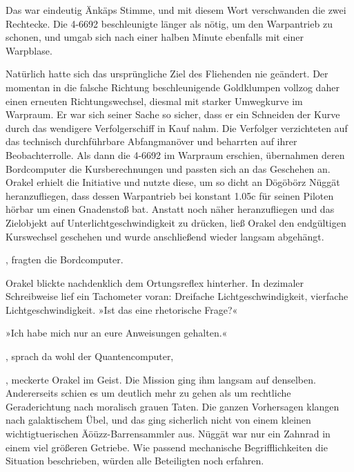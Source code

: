  Das war eindeutig Änkäps Stimme, und mit diesem Wort verschwanden die zwei Rechtecke. Die 4-6692 beschleunigte länger als nötig, um den Warpantrieb zu schonen, und umgab sich nach einer halben Minute ebenfalls mit einer Warpblase.

Natürlich hatte sich das ursprüngliche Ziel des Fliehenden nie geändert. Der momentan in die falsche Richtung beschleunigende Goldklumpen vollzog daher einen erneuten Richtungswechsel, diesmal mit starker Umwegkurve im Warpraum. Er war sich seiner Sache so sicher, dass er ein Schneiden der Kurve durch das wendigere Verfolgerschiff in Kauf nahm. Die Verfolger verzichteten auf das technisch durchführbare Abfangmanöver und beharrten auf ihrer Beobachterrolle. Als dann die 4-6692 im Warpraum erschien, übernahmen deren Bordcomputer die Kursberechnungen und passten sich an das Geschehen an. Orakel erhielt die Initiative und nutzte diese, um so dicht an Dögöbörz Nüggät heranzufliegen, dass dessen Warpantrieb bei konstant 1.05c für seinen Piloten hörbar um einen Gnadenstoß bat. Anstatt noch näher heranzufliegen und das Zielobjekt auf Unterlichtgeschwindigkeit zu drücken, ließ Orakel den endgültigen Kurswechsel geschehen und wurde anschließend wieder langsam abgehängt.

, fragten die Bordcomputer.

Orakel blickte nachdenklich dem Ortungsreflex hinterher. In dezimaler Schreibweise lief ein Tachometer voran: Dreifache Lichtgeschwindigkeit, vierfache Lichtgeschwindigkeit. »Ist das eine rhetorische Frage?«


»Ich habe mich nur an eure Anweisungen gehalten.«

, sprach da wohl der Quantencomputer, 

, meckerte Orakel im Geist. Die Mission ging ihm langsam auf denselben. Andererseits schien es um deutlich mehr zu gehen als um rechtliche Geraderichtung nach moralisch grauen Taten. Die ganzen Vorhersagen klangen nach galaktischem Übel, und das ging sicherlich nicht von einem kleinen wichtigtuerischen Äöüzz-Barrensammler aus. Nüggät war nur ein Zahnrad in einem viel größeren Getriebe. Wie passend mechanische Begrifflichkeiten die Situation beschrieben, würden alle Beteiligten noch erfahren.


